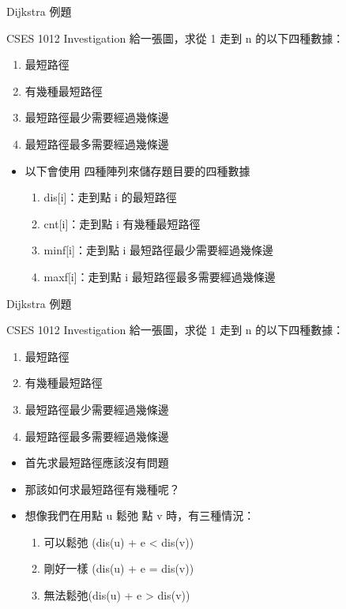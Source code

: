 \documentclass[aspectratio=169]{beamer}
\begin{document}
    \begin{frame}{Dijkstra 例題}
        \begin{block}{CSES 1012 Investigation}
            給一張圖，求從 1 走到 n 的以下四種數據：
            \begin{enumerate}
                \item 最短路徑
                \item 有幾種最短路徑
                \item 最短路徑最少需要經過幾條邊
                \item 最短路徑最多需要經過幾條邊
            \end{enumerate}
        \end{block}

        \begin{itemize}
            \item<2-> 以下會使用 四種陣列來儲存題目要的四種數據
            \begin{enumerate}
                \item dis[i]：走到點 i 的最短路徑
                \item cnt[i]：走到點 i 有幾種最短路徑
                \item minf[i]：走到點 i 最短路徑最少需要經過幾條邊
                \item maxf[i]：走到點 i 最短路徑最多需要經過幾條邊
            \end{enumerate}
        \end{itemize}
    \end{frame}

    \begin{frame}{Dijkstra 例題}
        \begin{block}{CSES 1012 Investigation}
            給一張圖，求從 1 走到 n 的以下四種數據：
            \begin{enumerate}
                \item 最短路徑
                \item 有幾種最短路徑
                \item 最短路徑最少需要經過幾條邊
                \item 最短路徑最多需要經過幾條邊
            \end{enumerate}
        \end{block}

        \begin{itemize}
            \item<1-> 首先求最短路徑應該沒有問題
            \item<2-> 那該如何求最短路徑有幾種呢？
            \item<3-> 想像我們在用點 u 鬆弛 點 v 時，有三種情況：
            \begin{enumerate}
                \item 可以鬆弛 (dis(u) + e < dis(v))
                \item 剛好一樣 (dis(u) + e = dis(v))
                \item 無法鬆弛(dis(u) + e > dis(v))
            \end{enumerate}
        \end{itemize}
    \end{frame}
\end{document}
